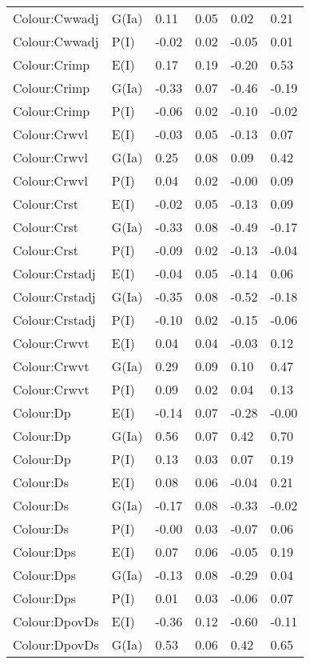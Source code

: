 \begin{center}
\begin{longtable}{|p{1.1in}|p{0.7in}|p{0.7in}|p{0.6in}|p{0.6in}|p{0.6in}|}
  Colour:Cwwadj & G(Ia) & 0.11 & 0.05 & 0.02 & 0.21 \\ 
  Colour:Cwwadj & P(I) & -0.02 & 0.02 & -0.05 & 0.01 \\ 
  Colour:Crimp & E(I) & 0.17 & 0.19 & -0.20 & 0.53 \\ 
  Colour:Crimp & G(Ia) & -0.33 & 0.07 & -0.46 & -0.19 \\ 
  Colour:Crimp & P(I) & -0.06 & 0.02 & -0.10 & -0.02 \\ 
  Colour:Crwvl & E(I) & -0.03 & 0.05 & -0.13 & 0.07 \\ 
  Colour:Crwvl & G(Ia) & 0.25 & 0.08 & 0.09 & 0.42 \\ 
  Colour:Crwvl & P(I) & 0.04 & 0.02 & -0.00 & 0.09 \\ 
  Colour:Crst & E(I) & -0.02 & 0.05 & -0.13 & 0.09 \\ 
  Colour:Crst & G(Ia) & -0.33 & 0.08 & -0.49 & -0.17 \\ 
  Colour:Crst & P(I) & -0.09 & 0.02 & -0.13 & -0.04 \\ 
  Colour:Crstadj & E(I) & -0.04 & 0.05 & -0.14 & 0.06 \\ 
  Colour:Crstadj & G(Ia) & -0.35 & 0.08 & -0.52 & -0.18 \\ 
  Colour:Crstadj & P(I) & -0.10 & 0.02 & -0.15 & -0.06 \\ 
  Colour:Crwvt & E(I) & 0.04 & 0.04 & -0.03 & 0.12 \\ 
  Colour:Crwvt & G(Ia) & 0.29 & 0.09 & 0.10 & 0.47 \\ 
  Colour:Crwvt & P(I) & 0.09 & 0.02 & 0.04 & 0.13 \\ 
  Colour:Dp & E(I) & -0.14 & 0.07 & -0.28 & -0.00 \\ 
  Colour:Dp & G(Ia) & 0.56 & 0.07 & 0.42 & 0.70 \\ 
  Colour:Dp & P(I) & 0.13 & 0.03 & 0.07 & 0.19 \\ 
  Colour:Ds & E(I) & 0.08 & 0.06 & -0.04 & 0.21 \\ 
  Colour:Ds & G(Ia) & -0.17 & 0.08 & -0.33 & -0.02 \\ 
  Colour:Ds & P(I) & -0.00 & 0.03 & -0.07 & 0.06 \\ 
  Colour:Dps & E(I) & 0.07 & 0.06 & -0.05 & 0.19 \\ 
  Colour:Dps & G(Ia) & -0.13 & 0.08 & -0.29 & 0.04 \\ 
  Colour:Dps & P(I) & 0.01 & 0.03 & -0.06 & 0.07 \\ 
  Colour:DpovDs & E(I) & -0.36 & 0.12 & -0.60 & -0.11 \\ 
  Colour:DpovDs & G(Ia) & 0.53 & 0.06 & 0.42 & 0.65 \\ 

\end{longtable}
\end{center}
